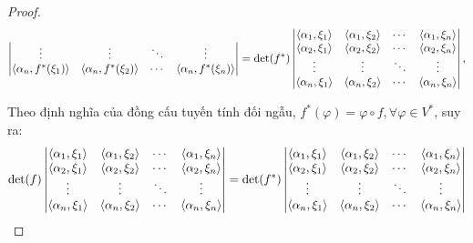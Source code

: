 \begin{proof}
\begin{align*}
\begin{vmatrix}
            \vdots                              & \vdots                              & \ddots & \vdots                              \\
            \left\langle{\alpha_{n},f^{*}(\xi_{1})}\right\rangle & \left\langle{\alpha_{n},f^{*}(\xi_{2})}\right\rangle & \cdots & \left\langle{\alpha_{n},f^{*}(\xi_{n})}\right\rangle \\
        \end{vmatrix}
         & = \det(f^{*})
        \begin{vmatrix}
            \left\langle{\alpha_{1},\xi_{1}}\right\rangle & \left\langle{\alpha_{1},\xi_{2}}\right\rangle & \cdots & \left\langle{\alpha_{1},\xi_{n}}\right\rangle \\
            \left\langle{\alpha_{2},\xi_{1}}\right\rangle & \left\langle{\alpha_{2},\xi_{2}}\right\rangle & \cdots & \left\langle{\alpha_{2},\xi_{n}}\right\rangle \\
            \vdots                       & \vdots                       & \ddots & \vdots                       \\
            \left\langle{\alpha_{n},\xi_{1}}\right\rangle & \left\langle{\alpha_{n},\xi_{2}}\right\rangle & \cdots & \left\langle{\alpha_{n},\xi_{n}}\right\rangle \\
        \end{vmatrix}, \\
    \end{align*}
    
    Theo định nghĩa của đồng cấu tuyến tính đối ngẫu, $f^{*}(\varphi) = \varphi\circ f, \forall\varphi\in V^{*}$, suy ra:
    \[
        \det(f)
        \begin{vmatrix}
            \left\langle{\alpha_{1},\xi_{1}}\right\rangle & \left\langle{\alpha_{1},\xi_{2}}\right\rangle & \cdots & \left\langle{\alpha_{1},\xi_{n}}\right\rangle \\
            \left\langle{\alpha_{2},\xi_{1}}\right\rangle & \left\langle{\alpha_{2},\xi_{2}}\right\rangle & \cdots & \left\langle{\alpha_{2},\xi_{n}}\right\rangle \\
            \vdots                       & \vdots                       & \ddots & \vdots                       \\
            \left\langle{\alpha_{n},\xi_{1}}\right\rangle & \left\langle{\alpha_{n},\xi_{2}}\right\rangle & \cdots & \left\langle{\alpha_{n},\xi_{n}}\right\rangle \\
        \end{vmatrix}
        =
        \det(f^{*})
        \begin{vmatrix}
            \left\langle{\alpha_{1},\xi_{1}}\right\rangle & \left\langle{\alpha_{1},\xi_{2}}\right\rangle & \cdots & \left\langle{\alpha_{1},\xi_{n}}\right\rangle \\
            \left\langle{\alpha_{2},\xi_{1}}\right\rangle & \left\langle{\alpha_{2},\xi_{2}}\right\rangle & \cdots & \left\langle{\alpha_{2},\xi_{n}}\right\rangle \\
            \vdots                       & \vdots                       & \ddots & \vdots                       \\
            \left\langle{\alpha_{n},\xi_{1}}\right\rangle & \left\langle{\alpha_{n},\xi_{2}}\right\rangle & \cdots & \left\langle{\alpha_{n},\xi_{n}}\right\rangle \\
        \end{vmatrix}
    \]
    

\end{proof}
